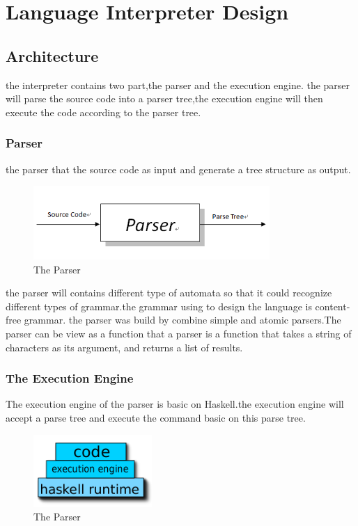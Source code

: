 \chapter{Language Interpreter Design}
\section{Architecture}
the interpreter contains two part,the parser and the execution engine. the
parser will parse the source code into a parser tree,the execution engine will
then execute the code according to the parser tree.

\subsection{Parser}
the parser that the source code as input and generate a tree structure as
output.

\begin{figure}[h!]
  \centering
	\includegraphics[width=0.80\textwidth]{pic/c4/parser.png}
	\caption{The Parser}
\end{figure}
the parser will contains different type of automata so that it could recognize different types of grammar.the grammar using to design the language
is content-free grammar.
the parser was build by combine simple and atomic parsers.The parser
can be view as a function that a parser is a function that takes a string of
characters as its argument, and returns a list of results.\cite{book}

\subsection{The Execution Engine}
The execution engine of the parser is basic on Haskell.the execution engine
will accept a parse tree and execute the command basic on this parse tree.
\begin{figure}[h!]
  \centering
	\includegraphics[width=0.40\textwidth]{pic/c4/structure.png}
	\caption{The Parser}
\end{figure}



